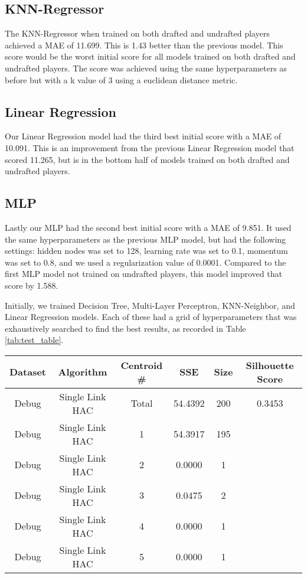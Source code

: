 \documentclass{article}
\begin{document}
\subsection{KNN-Regressor}

The KNN-Regressor when trained on both drafted and undrafted players achieved a MAE of 11.699. This is 1.43 better than 
the previous model. This score would be the worst initial score for all models trained on both drafted and undrafted players.
The score was achieved using the same hyperparameters as before but with a k value of 3 using a euclidean distance metric.

\subsection{Linear Regression}

Our Linear Regression model had the third best initial score with a MAE of 10.091. This is an improvement from the previous 
Linear Regression model that scored 11.265, but is in the bottom half of models trained on both drafted and undrafted players.

\subsection{MLP}

Lastly our MLP had the second best initial score with a MAE of 9.851. It used the same hyperparameters as the previous MLP model, 
but had the following settings: hidden nodes was set to 128, learning rate was set to 0.1, momentum was set to 0.8, and we used a 
regularization value of 0.0001. Compared to the first MLP model not trained on undrafted players, this model improved that score by 1.588.


Initially, we trained Decision Tree, Multi-Layer Perceptron, KNN-Neighbor, and
Linear Regression models. Each of these had a grid of hyperparameters that was
exhaustively searched to find the best results, as recorded in Table
\ref{tab:test_table}.

\begin{table*}
	\begin{center}
		\begin{tabular}{||c c c c c c||} 
		\hline\hline
		Dataset & Algorithm & Centroid \# & SSE & Size & Silhouette Score \\ 
		\hline\hline
		Debug & Single Link HAC & Total & 54.4392 & 200 & 0.3453 \\ \hline
		Debug & Single Link HAC & 1 & 54.3917 & 195 & \\ \hline
		Debug & Single Link HAC & 2 & 0.0000 & 1 & \\ \hline
		Debug & Single Link HAC & 3 & 0.0475 & 2 & \\ \hline
		Debug & Single Link HAC & 4 & 0.0000 & 1 & \\ \hline
		Debug & Single Link HAC & 5 & 0.0000 & 1 & \\ \hline
		\hline\hline
		\end{tabular}
	\end{center}
	\caption{Test table}
	\label{tab:test_table}
\end{table*}
\end{document}
